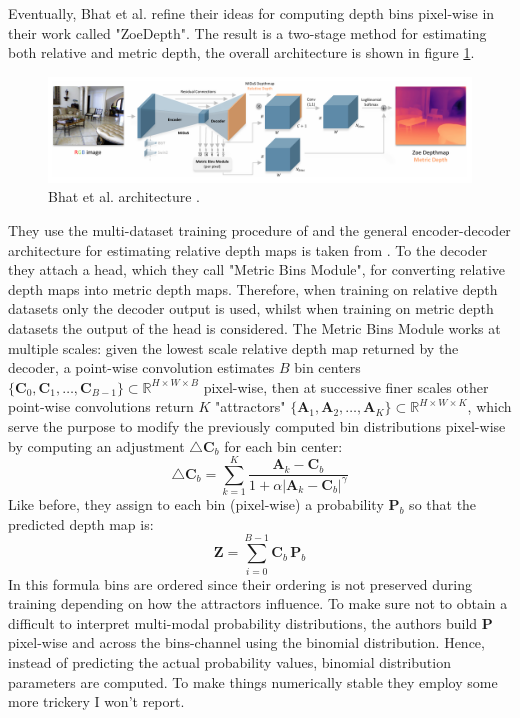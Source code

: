 Eventually, Bhat et al. \cite{ZoeDepth} refine their ideas for computing depth bins pixel-wise in their work called "ZoeDepth".
The result is a two-stage method for estimating both relative and metric depth, the overall architecture is shown in figure \ref{fig:zoe_depth}.

\begin{figure}
	\centering
	\includegraphics[scale=0.3]{figs/zoe_depth}
	\caption{Bhat et al. architecture \cite{ZoeDepth}. \label{fig:zoe_depth}}
\end{figure}

They use the multi-dataset training procedure of \cite{MiDas} and the general encoder-decoder architecture for estimating relative depth maps is taken from \cite{denseViT}.
To the decoder they attach a head, which they call "Metric Bins Module", for converting relative depth maps into metric depth maps.
Therefore, when training on relative depth datasets only the decoder output is used, whilst when training on metric depth datasets the output of the head is considered.
The Metric Bins Module works at multiple scales: given the lowest scale relative depth map returned by the decoder, a point-wise convolution estimates $B$ bin centers $\{\mathbf{C}_{0}, \mathbf{C}_{1}, \dotsc, \mathbf{C}_{B-1}\} \subset \mathbb{R}^{H \times W \times B}$ pixel-wise, then at successive finer scales other point-wise convolutions return $K$ "attractors" $\{\mathbf{A}_{1}, \mathbf{A}_{2}, \dotsc, \mathbf{A}_{K}\} \subset \mathbb{R}^{H \times W \times K}$, which serve the purpose to modify the previously computed bin distributions pixel-wise by computing an adjustment $\triangle \mathbf{C}_{b}$ for each bin center:
\[
	\triangle \mathbf{C}_{b} = \sum_{k=1}^{K} \frac{\mathbf{A}_{k} - \mathbf{C}_{b}}{1 + \alpha | \mathbf{A}_{k} - \mathbf{C}_{b} |^{\gamma}}
\]
Like before, they assign to each bin (pixel-wise) a probability $\mathbf{P}_{b}$ so that the predicted depth map is:
\[
	\mathbf{Z} = \sum_{i=0}^{B-1} \mathbf{C}_{b} \, \mathbf{P}_{b}
\]
In this formula bins are ordered since their ordering is not preserved during training depending on how the attractors influence.
To make sure not to obtain a difficult to interpret multi-modal probability distributions, the authors build $\mathbf{P}$ pixel-wise and across the bins-channel using the binomial distribution.
Hence, instead of predicting the actual probability values, binomial distribution parameters are computed.
To make things numerically stable they employ some more trickery I won't report.